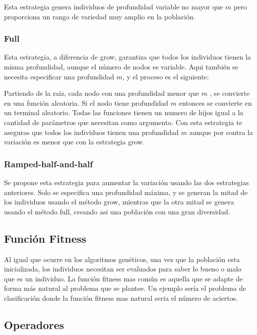 \documentclass[12pt]{article} \usepackage[utf8x]{inputenc}
\begin{document}
Esta estrategia genera individuos de profundidad variable no mayor que \(m\) pero proporciona un rango de variedad muy amplio en la población.

\subsubsection{Full}

Esta estrategia, a diferencia de grow, garantiza que todos los individuos tienen la misma profundidad, aunque el número de nodos es variable. Aqui también se necesita especificar una profundidad \(m\), y el proceso es el siguiente:

 Partiendo de la raiz, cada nodo con una profundidad menor que \(m\) , se convierte en una función aleatoria. Si el nodo tiene profundidad \(m\) entonces se convierte en un terminal aleatorio. 
 Todas las funciones tienen un numero de hijos igual a la cantidad de parámetros que necesitan como argumento. Con esta estrategia te aseguras que todos los individuos tienen una profundidad \(m\) aunque por contra la variación es menor que con la estrategia grow.\\
 
 \subsubsection{Ramped-half-and-half}
 
 Se propone esta estrategia para aumentar la variación usando las dos estrategias anteriores. Solo se especifica una profundidad máxima, y se generan la mitad de los individuos usando el método grow, mientras que la otra mitad se genera usando el método full, creando asi una población con una gran diversidad.
 
 \subsection{Función Fitness}
 
 Al igual que ocurre en los algoritmos genéticos, una vez que la población esta inicializada, los individuos necesitan ser evaluados para saber lo bueno o malo que es un individuo. La función fitness mas común es aquella que se adapte de forma más natural al problema que se plantee. Un ejemplo sería  el problema de clasificación donde la función fitness mas natural seria el número de aciertos.
 
 \subsection{Operadores}
 
\end{document}
